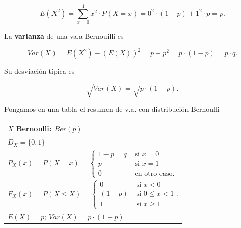 \documentclass[
  letterpaper,
  DIV=11,
  numbers=noendperiod]{scrreprt}
\begin{document}
\[E(X^2)=\displaystyle\sum_{x=0}^1 x^2\cdot P(X=x)= 0^2\cdot(1-p)+1^2\cdot p=p.\]

La \textbf{varianza} de una va.a Bernouilli es

\[Var(X)=E(X^2)-\left(E(X)\right)^2=p-p^2=p\cdot (1-p)=p\cdot q.\]

Su desviación típica es

\[
\sqrt{Var(X)}=\sqrt{p \cdot (1-p)}.
\]

Pongamos en una tabla el resumen de v.a. con distribución Bernoulli

\begin{table}
\centering
\begin{tabular}{|l|}
\hline\rowcolor{LightBlue}
$X$ Bernoulli: $Ber(p)$ 
\\\hline
$D_X= \{0,1\}$ 
\\\hline
$P_X(x)=P(X=x)=
\left\{
\begin{array}{ll}
1-p=q & \mbox{ si } x=0\\
p & \mbox{ si } x=1 \\
0 & \mbox{ en otro caso.}
\end{array}\right.
$ 
\\\hline
$F_X(x)=P(X\leq X)=
\left\{
\begin{array}{ll}
 0 & \mbox{ si } x<0\\ 
 (1-p) & \mbox{ si } 0\leq x< 1 \\ 
1 & \mbox{ si } x\geq 1
\end{array}
\right.$.
\\\hline
$E(X)=p$; $\scriptstyle Var(X)= p \cdot (1-p)$ \\\hline
\end{tabular}
\end{table}
\end{document}
